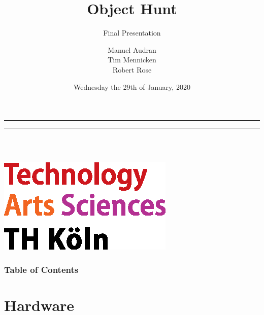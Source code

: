 \documentclass{beamer}
\title{Object Hunt}
\subtitle{Final Presentation}
\author[Manuel Audran, Tim Mennicken, Robert Rose]{Manuel Audran\\ Tim Mennicken\\ Robert Rose}
\institute[TH Köln]{University of Applied Sciences Cologne}
\date[29.01.2020] %
{Wednesday the 29th of January, 2020}
\begin{document}
\bgroup
\makeatletter
{}
{
	\leavevmode
    \begin{beamercolorbox}[wd=0.125\paperwidth,dp=1pt]{}
    \end{beamercolorbox}%
    \begin{beamercolorbox}[wd=0.875\paperwidth,dp=0ex]{}
    \hrule
    \vspace{0.1mm}
    \hrule
    \vspace{1mm}
    \parbox[b]{0.3\paperwidth}{\inserttitle\\[1.5mm] \insertshortauthor\\ \insertshortdate}
    \hfill
    \includegraphics[width=0.12\paperwidth]{sources/logo_TH-Koeln_CMYK_22pt}
    \hspace{2mm}
    \vspace{1mm}
    \end{beamercolorbox}%
}
\makeatother
\begin{frame}
\titlepage
\end{frame}
\egroup

\setcounter{framenumber}{0}

\begin{frame}
\frametitle{Table of Contents}
\tableofcontents
\end{frame} 
 
\section{Hardware}
\end{document}
